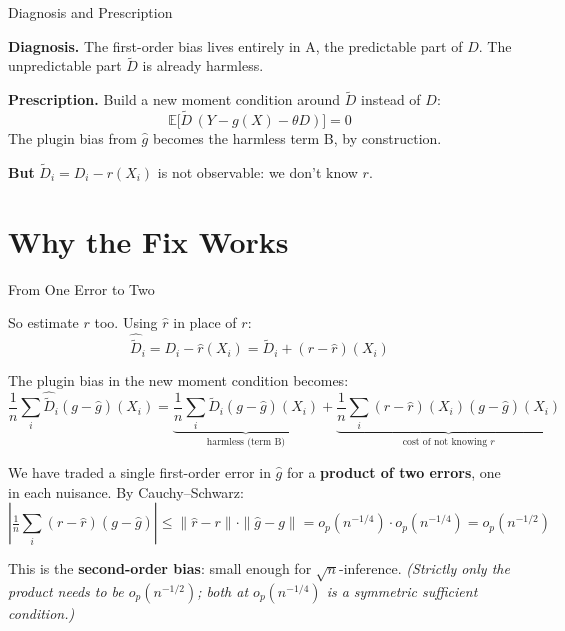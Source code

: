 \documentclass[aspectratio=169, 11pt, handout]{beamer}
\begin{document}
\begin{frame}{Diagnosis and Prescription}

\textbf{Diagnosis.} The first-order bias lives entirely in A, the predictable part of $D$. The unpredictable part $\tilde{D}$ is already harmless.

\pause
\bigskip

\textbf{Prescription.} Build a new moment condition around $\tilde{D}$ instead of $D$:
\[
\mathbb{E}\bigl[\tilde{D}\,(Y - g(X) - \theta D)\bigr] = 0
\]
The plugin bias from $\hat{g}$ becomes the harmless term B, by construction.

\pause
\bigskip

\textbf{But} $\tilde{D}_i = D_i - r(X_i)$ is not observable: we don't know $r$.

\end{frame}


\section{Why the Fix Works}

\begin{frame}{From One Error to Two}

So estimate $r$ too. Using $\hat{r}$ in place of $r$:
\[
\hat{\tilde{D}}_i = D_i - \hat{r}(X_i) = \tilde{D}_i + (r - \hat{r})(X_i)
\]

The plugin bias in the new moment condition becomes:
\[
\frac{1}{n}\sum_i \hat{\tilde{D}}_i (g - \hat{g})(X_i)
=
\underbrace{\frac{1}{n}\sum_i \tilde{D}_i (g - \hat{g})(X_i)}_{\text{harmless (term B)}}
+
\underbrace{\frac{1}{n}\sum_i (r - \hat{r})(X_i)(g - \hat{g})(X_i)}_{\text{cost of not knowing } r}
\]

\pause
\bigskip

We have traded a single first-order error in $\hat{g}$ for a \textbf{product of two errors}, one in each nuisance. By Cauchy--Schwarz:
\[
\left| \tfrac{1}{n}\sum_i (r - \hat{r})(g - \hat{g}) \right|
\leq \|\hat{r} - r\| \cdot \|\hat{g} - g\|
= o_p(n^{-1/4}) \cdot o_p(n^{-1/4}) = o_p(n^{-1/2})
\]

This is the \textbf{second-order bias}: small enough for $\sqrt n$-inference. \emph{(Strictly only the product needs to be $o_p(n^{-1/2})$; both at $o_p(n^{-1/4})$ is a symmetric sufficient condition.)}

\end{frame}
\end{document}
